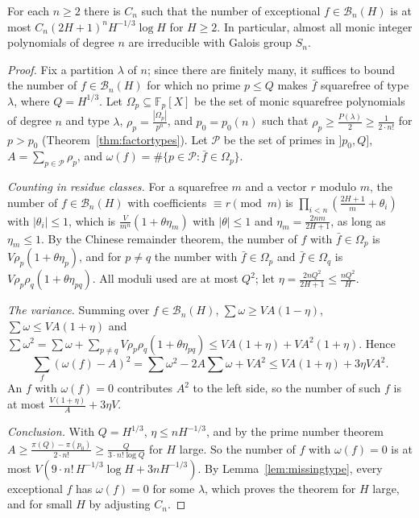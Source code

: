 \begin{theorem}\label{thm:vdw}
For each $n\ge2$ there is $C_n$ such that the number of exceptional $f\in\mathcal B_n(H)$ is at most $C_n(2H+1)^nH^{-1/3}\log H$ for $H\ge2$. In particular, almost all monic integer polynomials of degree $n$ are irreducible with Galois group $S_n$.
\end{theorem}
\begin{proof}
Fix a partition $\lambda$ of $n$; since there are finitely many, it suffices to bound the number of $f\in\mathcal B_n(H)$ for which no prime $p\le Q$ makes $\bar f$ squarefree of type $\lambda$, where $Q=H^{1/3}$. Let $\Omega_p\subseteq\mathbb F_p[X]$ be the set of monic squarefree polynomials of degree $n$ and type $\lambda$, $\rho_p=\frac{|\Omega_p|}{p^n}$, and $p_0=p_0(n)$ such that $\rho_p\ge\frac{P(\lambda)}2\ge\frac1{2\cdot n!}$ for $p>p_0$ (Theorem~\ref{thm:factortypes}). Let $\mathcal P$ be the set of primes in $]p_0,Q]$, $A=\sum_{p\in\mathcal P}\rho_p$, and $\omega(f)=\#\{p\in\mathcal P:\bar f\in\Omega_p\}$.

\emph{Counting in residue classes.} For a squarefree $m$ and a vector $r$ modulo $m$, the number of $f\in\mathcal B_n(H)$ with coefficients $\equiv r\pmod m$ is $\prod_{i<n}(\frac{2H+1}m+\theta_i)$ with $|\theta_i|\le1$, which is $\frac V{m^n}(1+\theta\eta_m)$ with $|\theta|\le1$ and $\eta_m=\frac{2nm}{2H+1}$, as long as $\eta_m\le1$. By the Chinese remainder theorem, the number of $f$ with $\bar f\in\Omega_p$ is $V\rho_p(1+\theta\eta_p)$, and for $p\ne q$ the number with $\bar f\in\Omega_p$ and $\bar f\in\Omega_q$ is $V\rho_p\rho_q(1+\theta\eta_{pq})$. All moduli used are at most $Q^2$; let $\eta=\frac{2nQ^2}{2H+1}\le\frac{nQ^2}H$.

\emph{The variance.} Summing over $f\in\mathcal B_n(H)$, $\sum\omega\ge VA(1-\eta)$, $\sum\omega\le VA(1+\eta)$ and $\sum\omega^2=\sum\omega+\sum_{p\ne q}V\rho_p\rho_q(1+\theta\eta_{pq})\le VA(1+\eta)+VA^2(1+\eta)$. Hence
\[
\sum_f(\omega(f)-A)^2=\sum\omega^2-2A\sum\omega+VA^2\le VA(1+\eta)+3\eta VA^2.
\]
An $f$ with $\omega(f)=0$ contributes $A^2$ to the left side, so the number of such $f$ is at most $\frac{V(1+\eta)}A+3\eta V$.

\emph{Conclusion.} With $Q=H^{1/3}$, $\eta\le nH^{-1/3}$, and by the prime number theorem $A\ge\frac{\pi(Q)-\pi(p_0)}{2\cdot n!}\ge\frac{Q}{3\cdot n!\log Q}$ for $H$ large. So the number of $f$ with $\omega(f)=0$ is at most $V(9\cdot n!\,H^{-1/3}\log H+3nH^{-1/3})$. By Lemma~\ref{lem:missingtype}, every exceptional $f$ has $\omega(f)=0$ for some $\lambda$, which proves the theorem for $H$ large, and for small $H$ by adjusting $C_n$.
\end{proof}

